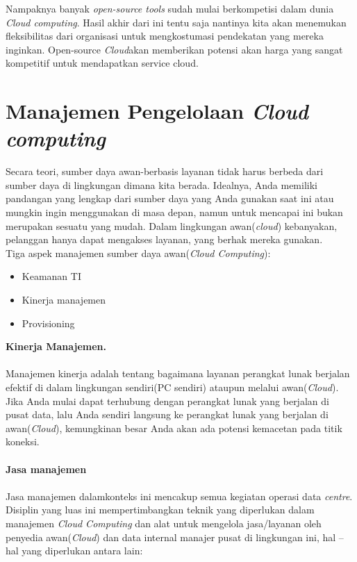 Nampaknya banyak \textit{open-source tools} sudah mulai berkompetisi dalam dunia \textit{Cloud computing}. Hasil akhir dari ini tentu saja nantinya kita akan menemukan fleksibilitas dari organisasi untuk mengkostumasi pendekatan yang mereka inginkan. Open-source \textit{Cloud}akan  memberikan potensi akan harga yang sangat kompetitif  untuk mendapatkan service cloud.
\section{Manajemen  Pengelolaan \textit{Cloud computing}}
Secara teori, sumber daya awan-berbasis layanan tidak harus berbeda dari sumber daya di lingkungan dimana kita berada. Idealnya, Anda memiliki pandangan yang lengkap dari sumber daya yang Anda gunakan saat ini atau mungkin ingin menggunakan di masa depan, namun untuk mencapai ini bukan merupakan sesuatu yang mudah. Dalam lingkungan awan(\textit{cloud}) kebanyakan, pelanggan hanya dapat mengakses layanan, yang berhak mereka  gunakan.\\
Tiga aspek manajemen sumber daya awan(\textit{Cloud Computing}):\\
\begin{itemize}
\item Keamanan TI
\item Kinerja manajemen
\item Provisioning
\end{itemize}
\textbf{Kinerja Manajemen.}\\\\
Manajemen kinerja adalah tentang bagaimana layanan perangkat lunak berjalan efektif  di  dalam lingkungan sendiri(PC sendiri) ataupun melalui awan(\textit{Cloud}). Jika Anda mulai dapat terhubung dengan perangkat lunak yang berjalan di pusat data, lalu Anda sendiri langsung ke perangkat lunak yang berjalan di awan(\textit{Cloud}), kemungkinan besar Anda akan ada potensi kemacetan pada titik koneksi.\\\\
\textbf{Jasa manajemen}\\\\
Jasa manajemen dalamkonteks ini mencakup semua kegiatan operasi data \textit{centre}.\\
Disiplin yang luas ini mempertimbangkan teknik yang diperlukan dalam manajemen \textit{Cloud Computing} dan alat untuk mengelola jasa/layanan oleh penyedia awan(\textit{Cloud}) dan data internal manajer pusat di lingkungan ini, hal –hal yang diperlukan antara lain:\\
